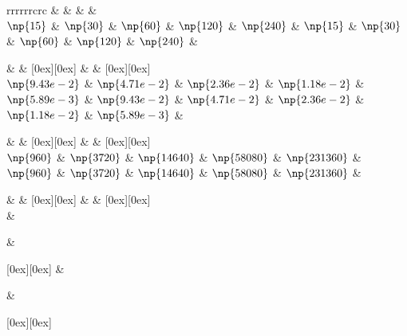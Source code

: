 \begin{tabular}{rrrrrrcrc}
  &  
  &  
  &  
  &  
 \\
$ \np{15} $  &  $ \np{30} $  &  $ \np{60} $  &  $ \np{120} $  &  $ \np{240} $  &  $ \np{15} $  &  $ \np{30} $  &  $ \np{60} $  &  $ \np{120} $  &  $ \np{240} $  &  

  &  
  &  
\raisebox{1.5ex}[0ex][0ex]{\bf {}}  &  
  &  
\raisebox{1.5ex}[0ex][0ex]{\bf {}} \\
$ \np{9.43e-2} $  &  $ \np{4.71e-2} $  &  $ \np{2.36e-2} $  &  $ \np{1.18e-2} $  &  $ \np{5.89e-3} $  &  $ \np{9.43e-2} $  &  $ \np{4.71e-2} $  &  $ \np{2.36e-2} $  &  $ \np{1.18e-2} $  &  $ \np{5.89e-3} $  &  

  &  
  &  
\raisebox{1.5ex}[0ex][0ex]{\bf {}}  &  
  &  
\raisebox{1.5ex}[0ex][0ex]{\bf {}} \\
$ \np{960} $  &  $ \np{3720} $  &  $ \np{14640} $  &  $ \np{58080} $  &  $ \np{231360} $  &  $ \np{960} $  &  $ \np{3720} $  &  $ \np{14640} $  &  $ \np{58080} $  &  $ \np{231360} $  &  

  &  
  &  
\raisebox{1.5ex}[0ex][0ex]{\bf {}}  &  
  &  
\raisebox{1.5ex}[0ex][0ex]{\bf {}} \\


  &      %

  &      %

\raisebox{1.5ex}[0ex][0ex]{\bf {}}  &      %

  &      %

\raisebox{1.5ex}[0ex][0ex]{\bf {}} \\



\end{tabular}
